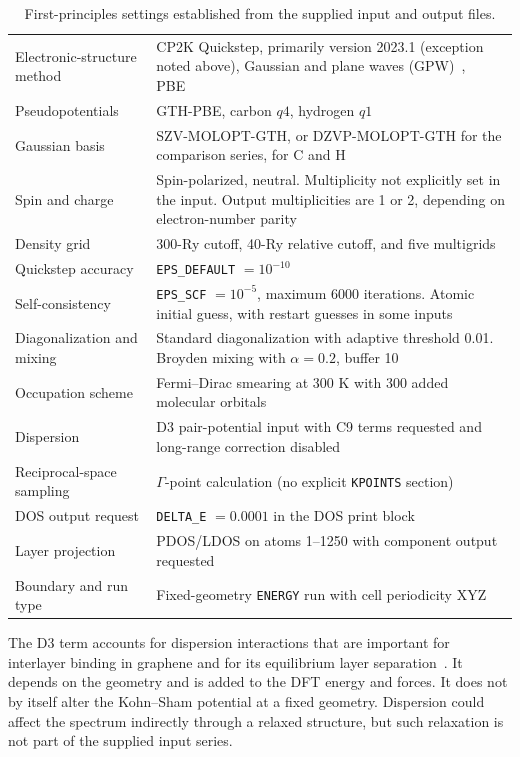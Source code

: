 \documentclass[aps,prl,10pt,onecolumn,superscriptaddress,longbibliography]{revtex4-2}
\begin{document}
\begin{table}[h]
\caption{First-principles settings established from the supplied input and output files.}
\label{tab:settings}
\begin{ruledtabular}
\begin{tabular}{p{}p{}}
Electronic-structure method & CP2K Quickstep, primarily version 2023.1 (exception noted above), Gaussian and plane waves (GPW)~\cite{cp2k2020,cp2k2026}, PBE~\cite{pbe1996} \\
Pseudopotentials & GTH-PBE, carbon $q4$, hydrogen $q1$ \\
Gaussian basis & SZV-MOLOPT-GTH, or DZVP-MOLOPT-GTH for the comparison series, for C and H \\
Spin and charge & Spin-polarized, neutral. Multiplicity not explicitly set in the input. Output multiplicities are 1 or 2, depending on electron-number parity \\
Density grid & 300-Ry cutoff, 40-Ry relative cutoff, and five multigrids \\
Quickstep accuracy & \texttt{EPS\_DEFAULT} $=10^{-10}$ \\
Self-consistency & \texttt{EPS\_SCF} $=10^{-5}$, maximum 6000 iterations. Atomic initial guess, with restart guesses in some inputs \\
Diagonalization and mixing & Standard diagonalization with adaptive threshold 0.01. Broyden mixing with $\alpha=0.2$, buffer 10 \\
Occupation scheme & Fermi--Dirac smearing at 300 K with 300 added molecular orbitals \\
Dispersion & D3 pair-potential input with C9 terms requested and long-range correction disabled~\cite{grimme2010} \\
Reciprocal-space sampling & $\Gamma$-point calculation (no explicit \texttt{KPOINTS} section) \\
DOS output request & \texttt{DELTA\_E} $=0.0001$ in the DOS print block \\
Layer projection & PDOS/LDOS on atoms 1--1250 with component output requested \\
Boundary and run type & Fixed-geometry \texttt{ENERGY} run with cell periodicity XYZ
\end{tabular}
\end{ruledtabular}
\end{table}

The D3 term accounts for dispersion interactions that are important for interlayer binding in graphene and for its equilibrium layer separation~\cite{lebedeva2017}. It depends on the geometry and is added to the DFT energy and forces. It does not by itself alter the Kohn--Sham potential at a fixed geometry. Dispersion could affect the spectrum indirectly through a relaxed structure, but such relaxation is not part of the supplied input series.
\end{document}

